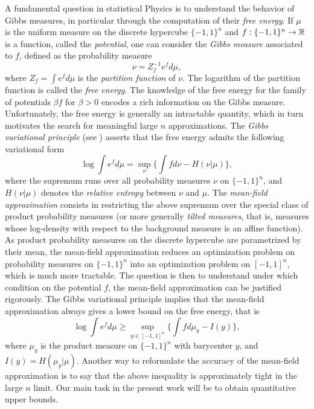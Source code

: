 \documentclass[a4paper,oneside,11pt]{article}
\begin{document}
A fundamental question in statistical Physics is to understand the behavior of Gibbs measures, in particular through the computation of their \textit{free energy}. If  $\mu$ is the uniform measure on the discrete hypercube $\{-1,1\}^n$ and  $f: \{-1,1\}^n \to \mathbb{R}$ is a function, called the \textit{potential}, one can consider the \textit{Gibbs measure} associated to $f$, defined as the probability measure
$$ \nu = Z_f^{-1}e^{f}d\mu,$$
where $Z_{f} = \int e^{f } d\mu$ is the \textit{partition function} of $\nu$. The logarithm of the partition function is called the \textit{free energy}. The knowledge of the free energy for the family of  potentials $\beta f$ for $\beta>0$ encodes a rich information on the Gibbs measure. Unfortunately, the free energy is generally an intractable quantity, which in turn motivates the search for meaningful large $n$ approximations.  The \textit{Gibbs variational principle} (see \cite[Lemma 6.2.13]{DZ}) asserts that the free energy admits the following variational form
\begin{equation}\label{Gibbs} \log \int e^{f} d\mu = \sup_{\nu } \big\{ \int f d\nu - H(\nu|\mu) \big\},\end{equation}
where the supremum runs over all probability measures $\nu$ on $\{-1,1\}^n$, and $H(\nu|\mu)$ denotes the \textit{relative entropy} between $\nu$ and $\mu$. The \textit{mean-field approximation} consists in restricting the above supremum over the special class of product probability measures (or more generally \textit{tilted measures}, that is, measures whose log-density with respect to the background measure is an affine function). As product probability measures on the discrete hypercube are parametrized by their mean, the mean-field approximation reduces an optimization problem on probability measures on $\{-1,1\}^n$ into an optimization problem on $[-1,1]^n$, which is much more tractable. The question is then to understand under which condition on the potential $f$, the mean-field approximation can be justified rigorously. The Gibbs variational principle implies that the mean-field approximation always gives a lower bound on the free energy, that is
\begin{equation} \label{lowerbound} \log \int e^{f } d\mu \geq \sup_{ y \in [-1,1]^n } \big\{ \int f d \mu_y - I(y) \big\},\end{equation}
where  $\mu_y$ is the product measure on $\{-1,1\}^n$ with barycenter $y$, and $I(y) = H(\mu_y | \mu)$.
Another way to reformulate the accuracy of the mean-field approximation is to say that the above inequality is approximately tight in the large $n$ limit. Our main task in the present work will be to obtain quantitative upper bounds.
\end{document}

